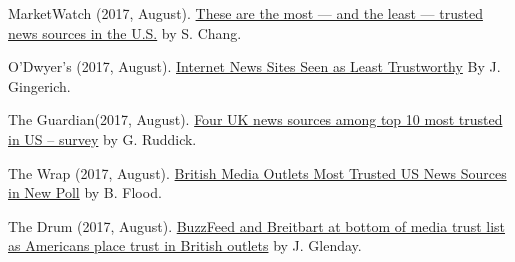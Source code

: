 \begin{bibenum}
    \item[] MarketWatch (2017, August).
      \href{https://www.marketwatch.com/story/these-are-the-most-and-the-least-trusted-news-sources-in-the-us-2017-08-03}{These are the most — and the least — trusted news sources in the U.S.} by S. Chang.
    \item[] O'Dwyer's (2017, August).
      \href{http://www.odwyerpr.com/story/public/9210/2017-08-08/internet-news-sites-seen-as-least-trustworthy.html}{Internet News Sites Seen as Least Trustworthy} By J. Gingerich.
    \item[] The Guardian(2017, August).
      \href{https://www.theguardian.com/media/2017/aug/09/four-uk-news-sources-among-top-10-most-trusted-in-us-survey}{Four UK news sources among top 10 most trusted in US – survey} by G. Ruddick.
    \item[] The Wrap (2017, August).
      \href{https://www.thewrap.com/british-media-outlets-most-trusted-us-news-sources-in-new-poll/}{British Media Outlets Most Trusted US News Sources in New Poll} by B. Flood.
    \item[] The Drum (2017, August).
      \href{http://www.thedrum.com/news/2017/08/08/buzzfeed-and-breitbart-bottom-media-trust-list-americans-place-trust-british-outlets}{BuzzFeed and Breitbart at bottom of media trust list as Americans place trust in British outlets} by J. Glenday.
  \end{bibenum}
